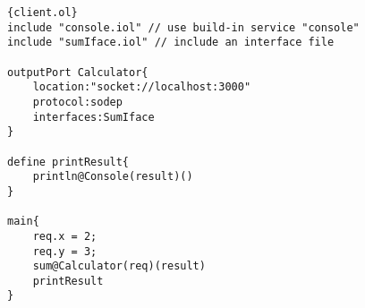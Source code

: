 \begin{listing}
    \lstset{language=Jolie,
        style=codeStyle,
        numbers=left,
        firstnumber=1
    }
    \begin{lstlisting}[frame=tlrb,caption= {Sum client example}, label={list:example-client}]{client.ol}
include "console.iol" // use build-in service "console"
include "sumIface.iol" // include an interface file 

outputPort Calculator{
    location:"socket://localhost:3000"
    protocol:sodep 
    interfaces:SumIface
}

define printResult{
    println@Console(result)()
}

main{
    req.x = 2;
    req.y = 3;
    sum@Calculator(req)(result)
    printResult
}
\end{lstlisting}
\end{listing}
